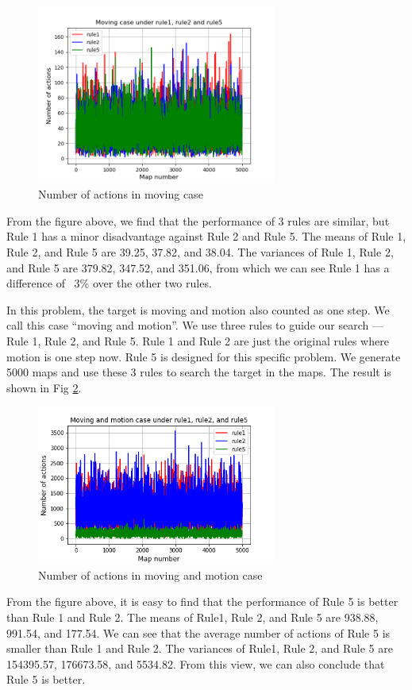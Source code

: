 \documentclass[letter]{article}
\begin{document}
	\begin{figure}[H]
		\centering
		\includegraphics[width=0.7\textwidth]{fig/part2-first.png}
		\caption{Number of actions in moving case}
		\label{fig:part2-first}
	\end{figure}
	
	From the figure above, we find that the performance of 3 rules are similar, but Rule 1 has a minor disadvantage against Rule 2 and Rule 5. The means of Rule 1, Rule 2, and Rule 5 are 39.25, 37.82, and 38.04. The variances of Rule 1, Rule 2, and Rule 5 are 379.82, 347.52, and 351.06, from which we can see Rule 1 has a difference of ~3\% over the other two rules.
	

	In this problem, the target is moving and motion also counted as one step. We call this case ``moving and motion''. We use three rules to guide our search --- Rule 1, Rule 2, and Rule 5. Rule 1 and Rule 2 are just the original rules where motion is one step now. Rule 5 is designed for this specific problem. We generate 5000 maps and use these 3 rules to search the target in the maps. The result is shown in Fig \ref{fig:part2-last.png}.
	
	
	\begin{figure}[H]
		\centering
		\includegraphics[width=0.7\textwidth]{fig/part2-last.png}
		\caption{Number of actions in moving and motion case}
		\label{fig:part2-last.png}
	\end{figure}
	
	From the figure above, it is easy to find that the performance of Rule 5 is better than Rule 1 and Rule 2. The means of Rule1, Rule 2, and Rule 5 are 938.88, 991.54, and 177.54.
	We can see that the average number of actions of Rule 5 is smaller than Rule 1 and Rule 2. The variances of Rule1, Rule 2, and Rule 5 are 154395.57, 176673.58, and 5534.82.
	From this view, we can also conclude that Rule 5 is better.
	
\end{document}
